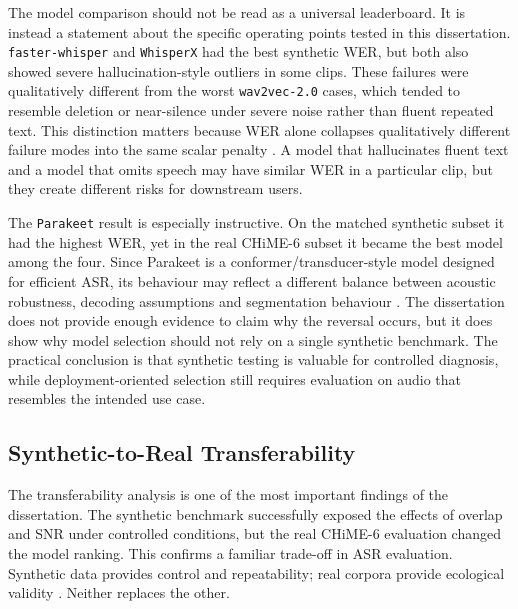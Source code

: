 The model comparison should not be read as a universal leaderboard. It is instead a statement about the specific operating points tested in this dissertation. \texttt{faster-whisper} and \texttt{WhisperX} had the best synthetic WER, but both also showed severe hallucination-style outliers in some clips. These failures were qualitatively different from the worst \texttt{wav2vec-2.0} cases, which tended to resemble deletion or near-silence under severe noise rather than fluent repeated text. This distinction matters because WER alone collapses qualitatively different failure modes into the same scalar penalty \citep{morris04_interspeech, sasindran2023hevalnewhybridevaluation, ellis2026werunawareassessingasr, hughes2025problemwithwer}. A model that hallucinates fluent text and a model that omits speech may have similar WER in a particular clip, but they create different risks for downstream users.

The \texttt{Parakeet} result is especially instructive. On the matched synthetic subset it had the highest WER, yet in the real CHiME-6 subset it became the best model among the four. Since Parakeet is a conformer/transducer-style model designed for efficient ASR, its behaviour may reflect a different balance between acoustic robustness, decoding assumptions and segmentation behaviour \citep{sekoyan2025canary1bv2parakeettdt06bv3efficient, nvidia/parakeet-tdt-0.6b-v3}. The dissertation does not provide enough evidence to claim why the reversal occurs, but it does show why model selection should not rely on a single synthetic benchmark. The practical conclusion is that synthetic testing is valuable for controlled diagnosis, while deployment-oriented selection still requires evaluation on audio that resembles the intended use case.

\subsection{Synthetic-to-Real Transferability}
The transferability analysis is one of the most important findings of the dissertation. The synthetic benchmark successfully exposed the effects of overlap and SNR under controlled conditions, but the real CHiME-6 evaluation changed the model ranking. This confirms a familiar trade-off in ASR evaluation. Synthetic data provides control and repeatability; real corpora provide ecological validity \citep{ami-corpus, carletta2005ami, chime6, watanabe2020chime6challengetacklingmultispeakerspeech}. Neither replaces the other.

